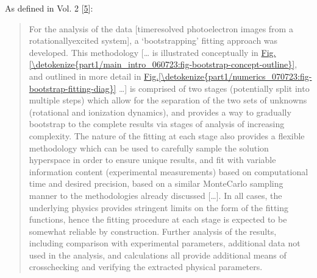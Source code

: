 \documentclass[letterpaper,table,10pt,english]{jupyterBook}
\begin{document}
\sphinxAtStartPar
As defined in  Vol. 2 {[}\hyperlink{cite.backmatter/bibliography:id664}{5}{]}:
\begin{quote}

\sphinxAtStartPar
For the analysis of the data {[}time\sphinxhyphen{}resolved photoelectron images from a rotationally\sphinxhyphen{}excited system{]}, a ‘bootstrapping’ fitting approach was developed. This methodology {[}… is illustrated conceptually in \hyperref[\detokenize{part1/main_intro_060723:fig-bootstrap-concept-outline}]{Fig.\@ \ref{\detokenize{part1/main_intro_060723:fig-bootstrap-concept-outline}}}, and outlined in more detail in \hyperref[\detokenize{part1/numerics_070723:fig-bootstrap-fitting-diag}]{Fig.\@ \ref{\detokenize{part1/numerics_070723:fig-bootstrap-fitting-diag}}} …{]} is comprised of two stages (potentially split into multiple steps) which allow for the separation of the two sets of unknowns (rotational and ionization dynamics), and provides a way to gradually bootstrap to the complete {\hyperref[\detokenize{backmatter/glossary:term-MF}]{}} results via stages of analysis of increasing complexity. The nature of the fitting at each stage also provides a flexible methodology which can be used to carefully sample the solution hyperspace in order to ensure unique results, and fit with variable information content (experimental measurements) based on computational time and desired precision, based on a similar Monte\sphinxhyphen{}Carlo sampling manner to the methodologies already discussed {[}…{]}. In all cases, the underlying physics provides stringent limits on the form of the fitting functions, hence the fitting procedure at each stage is expected to be somewhat reliable by construction. Further analysis of the results, including comparison with experimental parameters, additional data not used in the analysis, and  calculations all provide additional means of cross\sphinxhyphen{}checking and verifying the extracted physical parameters.


\end{quote}
\end{document}

